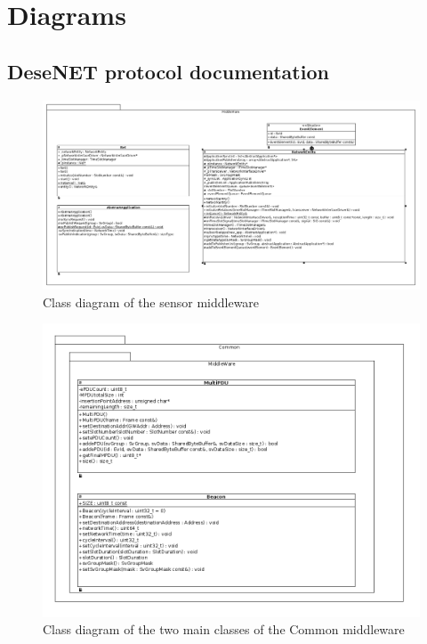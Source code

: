 \section{Diagrams}

\subsection{DeseNET protocol documentation}

\begin{figure}[H]
	\centering
	\includegraphics[width=\linewidth]{images/sensor_middleWare.png}
	\caption{Class diagram of the sensor middleware}
	\label{fig:sensor_middleware}
\end{figure}

\begin{figure}[H]
	\centering
	\includegraphics[width=\linewidth]{images/common_MultiPDU_Beacon.png}
	\caption{Class diagram of the two main classes of the Common middleware}
	\label{fig:common_middleware}
\end{figure}

